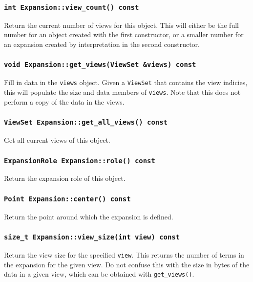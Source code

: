 \subsubsection{\texttt{int Expansion::view\_count() const}}

Return the current number of views for this object. This will either be the
full number for an object created with the first constructor, or a smaller
number for an expansion created by interpretation in the second constructor.

\subsubsection{\texttt{void Expansion::get\_views(ViewSet \&views) const}}

Fill in data in the \texttt{views} object. Given a \texttt{ViewSet} that
contains the view indicies, this will populate the size and data members of
\texttt{views}. Note that this does not perform a copy of the data in the
views.

\subsubsection{\texttt{ViewSet Expansion::get\_all\_views() const}}

Get all current views of this object.

\subsubsection{\texttt{ExpansionRole Expansion::role() const}}

Return the expansion role of this object.

\subsubsection{\texttt{Point Expansion::center() const}}

Return the point around which the expansion is defined.

\subsubsection{\texttt{size\_t Expansion::view\_size(int view) const}}

Return the view size for the specified \texttt{view}. This returns the number
of terms in the expansion for the given view. Do not confuse this with the
size in bytes of the data in a given view, which can be obtained with
\texttt{get\_views()}.

